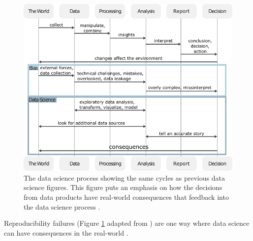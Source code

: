 \documentclass[../main.tex]{subfiles}
\begin{document}
    \begin{figure}[!hbtp]
        \centering
        \includegraphics[scale=0.8]{figs/050-intro/data_science_figure}
        \caption[Data Science and It's Consequences]{
        The data science process showing the same cycles as previous data science figures.
        This figure puts an emphasis on how the decisions from data products have real-world consequences that feedback into
        the data science process \cite{Chen2020}.
        }
        \label{fig:data_science_consequences}
    \end{figure}

    Reproducibility failures (Figure \ref{fig:data_science_consequences} adapted
    from \cite{ostblomOpinionatedPracticesTeaching2021}) are one way where data
    science can have consequences in the real-world
    \cite{aboumatarNoticeRetractionAboumatar2019, ExcelWhyUsing2020,
    ostblomOpinionatedPracticesTeaching2021,
    wallensteenRetractionNoticeEvaluation2018,
    whitehouseRetractionNoteComplex2021, zeebergMistakenIdentifiersGene2004,
    ziemannGeneNameErrors2016}.
\end{document}
